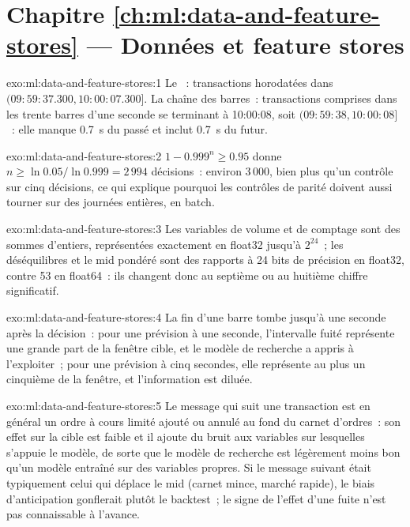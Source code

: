 \section*{Chapitre \ref{ch:ml:data-and-feature-stores} --- Données et feature stores}

\begin{solution}{exo:ml:data-and-feature-stores:1}
Le ~: transactions horodatées dans $(09{:}59{:}37.300, 10{:}00{:}07.300]$. La chaîne des barres~: transactions comprises dans les trente barres
d'une seconde se terminant à 10:00:08, soit $(09{:}59{:}38, 10{:}00{:}08]$~: elle manque 0.7~s du passé et inclut 0.7~s du futur.
\end{solution}

\begin{solution}{exo:ml:data-and-feature-stores:2}
$1 - 0.999^n\ge0.95$ donne $n\ge\ln0.05/\ln0.999 = 2\,994$ décisions~: environ 3\,000, bien plus qu'un contrôle sur cinq décisions, ce qui explique
pourquoi les contrôles de parité doivent aussi tourner sur des journées entières, en batch.
\end{solution}

\begin{solution}{exo:ml:data-and-feature-stores:3}
Les variables de volume et de comptage sont des sommes d'entiers, représentées exactement en float32 jusqu'à $2^{24}$~; les déséquilibres et le
mid pondéré sont des rapports à 24 bits de précision en float32, contre 53 en float64~: ils changent donc au septième ou au huitième
chiffre significatif.
\end{solution}

\begin{solution}{exo:ml:data-and-feature-stores:4}
La fin d'une barre tombe jusqu'à une seconde après la décision~: pour une prévision à une seconde, l'intervalle fuité représente une grande part
de la fenêtre cible, et le modèle de recherche a appris à l'exploiter~; pour une prévision à cinq secondes, elle représente au plus un cinquième de la fenêtre, et
l'information est diluée.
\end{solution}

\begin{solution}{exo:ml:data-and-feature-stores:5}
Le message qui suit une transaction est en général un ordre à cours limité ajouté ou annulé au fond du carnet d'ordres~: son effet sur la cible est faible et
il ajoute du bruit aux variables sur lesquelles s'appuie le modèle, de sorte que le modèle de recherche est légèrement moins bon qu'un modèle entraîné sur des variables propres. Si
le message suivant était typiquement celui qui déplace le mid (carnet mince, marché rapide), le biais d'anticipation gonflerait plutôt
le backtest~; le signe de l'effet d'une fuite n'est pas connaissable à l'avance.
\end{solution}

